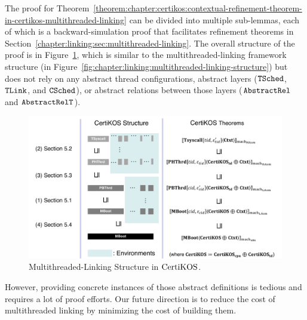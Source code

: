 The proof for Theorem~\ref{theorem:chapter:certikos:contextual-refinement-theorem-in-certikos-multithreaded-linking} 
can be divided into multiple sub-lemmas, each of which is a backward-simulation proof 
that facilitates  refinement theorems in Section~\ref{chapter:linking:sec:multithreaded-linking}. 
The overall structure of the proof is in Figure~\ref{fig:chapter:certikos:multithreaded-connect-proof-overall-structure}, which is 
similar to the multithreaded-linking framework structure (in Figure~\ref{fig:chapter:linking:multithreaded-linking-structure}) but does not rely on
any abstract thread configurations,  abstract layers (${{\mathrm{\texttt{TSched}}}}$, ${{\mathrm{\texttt{TLink}}}}$, and ${{\mathrm{\texttt{CSched}}}}$), or 
 abstract relations between those layers (${\mathrm{\texttt{AbstractRel}}}$ and ${\mathrm{\texttt{AbstractRelT}}}$).
\begin{figure}
\includegraphics[width=\textwidth, page=3]{figs/certikos/concurrent_linking}
\caption{Multithreaded-Linking Structure in $\mathrm{CertiKOS}$.}
\label{fig:chapter:certikos:multithreaded-connect-proof-overall-structure}
\end{figure}
However, providing concrete instances of those abstract definitions is tedious and requires a lot of proof efforts. 
Our future direction is to reduce the cost of multithreaded linking by minimizing the cost of building 
them.

%



